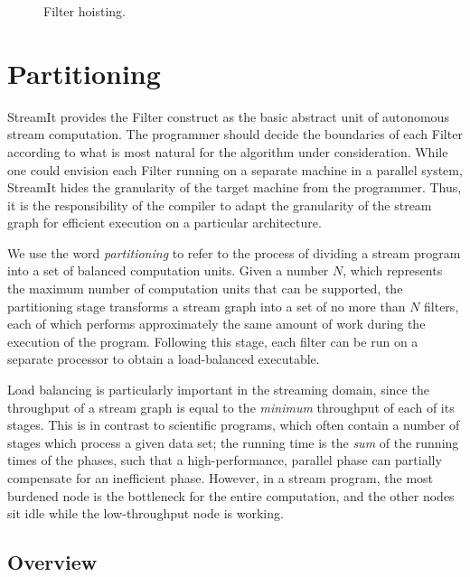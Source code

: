 \begin{figure}
\vspace{-6pt}
\centering
{}
\vspace{-12pt}
\caption{\protect\small Filter hoisting.
\protect\label{fig:splitjoin-split}}
\vspace{-6pt}
\end{figure}

\section{Partitioning}
\label{sec:partition}

StreamIt provides the Filter construct as the basic abstract unit of
autonomous stream computation.  The programmer should decide the
boundaries of each Filter according to what is most natural for the
algorithm under consideration.  While one could envision each Filter
running on a separate machine in a parallel system, StreamIt hides the
granularity of the target machine from the programmer.  Thus, it is
the responsibility of the compiler to adapt the granularity of the
stream graph for efficient execution on a particular architecture.

We use the word {\it partitioning} to refer to the process of dividing
a stream program into a set of balanced computation units.  Given a
number $N$, which represents the maximum number of computation units
that can be supported, the partitioning stage transforms a stream
graph into a set of no more than $N$ filters, each of which performs
approximately the same amount of work during the execution of the
program.  Following this stage, each filter can be run on a separate
processor to obtain a load-balanced executable.

Load balancing is particularly important in the streaming domain,
since the throughput of a stream graph is equal to the {\it minimum}
throughput of each of its stages.  This is in contrast to scientific
programs, which often contain a number of stages which process a given
data set; the running time is the {\it sum} of the running times of
the phases, such that a high-performance, parallel phase can partially
compensate for an inefficient phase.  However, in a stream program,
the most burdened node is the bottleneck for the entire computation,
and the other nodes sit idle while the low-throughput node is working.

\subsection{Overview}


